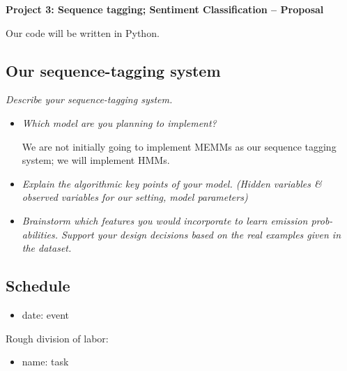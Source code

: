 \documentclass{article}
\begin{document}
\begin{center}\textbf{Project 3: Sequence tagging; Sentiment Classification -- Proposal}\end{center}

Our code will be written in Python.

\subsection*{Our sequence-tagging system}

\textit{Describe your sequence-tagging system.}\par
\lipsum[4]

\begin{itemize}
\item \textit{Which model are you planning to implement?}\par

We are not initially going to implement MEMMs as our sequence tagging system; we will implement HMMs.

\item \textit{Explain the algorithmic key points of your model. (Hidden variables \& observed variables for our setting, model parameters)}\par

\item \textit{Brainstorm which features you would incorporate to learn emission prob-
abilities. Support your design decisions based on the real examples given
in the dataset.}\par

\end{itemize}

\subsection*{Schedule}

\begin{itemize}[noitemsep,nolistsep]
\item date: event
\end{itemize}

Rough division of labor:
\begin{itemize}[noitemsep,nolistsep]
\item name: task
\end{itemize}
\end{document}
